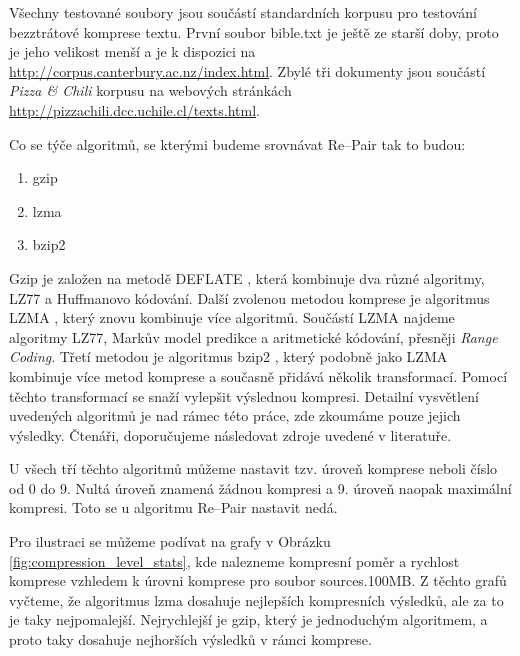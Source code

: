 \documentclass[a4paper,12pt]{article}
\begin{document}
Všechny testované soubory jsou součástí standardních korpusu pro testování bezztrátové komprese textu. První soubor bible.txt je ještě ze starší doby, proto je jeho velikost menší a 
je k dispozici na \url{http://corpus.canterbury.ac.nz/index.html}. Zbylé tři dokumenty jsou součástí \emph{Pizza \& Chili} korpusu na webových stránkách \linebreak \url{http://pizzachili.dcc.uchile.cl/texts.html}.

Co se týče algoritmů, se kterými budeme srovnávat Re--Pair tak to budou:
\begin{enumerate}
    \item gzip
    \item lzma
    \item bzip2
\end{enumerate}

Gzip je založen na metodě DEFLATE \cite{deflate_spec}, která kombinuje dva různé algoritmy, LZ77 \cite{LZ77} a Huffmanovo kódování. Další zvolenou metodou komprese je algoritmus LZMA \cite{lzma}, který znovu kombinuje více algoritmů. Součástí LZMA najdeme algoritmy LZ77, Markův model predikce a aritmetické kódování, přesněji \emph{Range Coding}. Třetí metodou je algoritmus bzip2 \cite{bzip2}, který podobně jako LZMA kombinuje více metod komprese a současně přidává několik transformací. Pomocí těchto transformací se snaží vylepšit výslednou kompresi. Detailní vysvětlení uvedených algoritmů je nad rámec této práce, zde zkoumáme pouze jejich výsledky. Čtenáři, doporučujeme následovat zdroje uvedené v literatuře.

U všech tří těchto algoritmů můžeme nastavit tzv. úroveň komprese neboli číslo od 0 do 9. Nultá úroveň znamená žádnou kompresi a 9. úroveň naopak maximální kompresi. Toto se u algoritmu Re--Pair nastavit nedá. 

Pro ilustraci se můžeme podívat na grafy v Obrázku \ref{fig:compression_level_stats}, kde nalezneme kompresní poměr a rychlost komprese vzhledem k úrovni komprese pro soubor sources.100MB. \linebreak Z těchto grafů vyčteme, že algoritmus lzma dosahuje nejlepších kompresních výsledků, ale za to je taky nejpomalejší. Nejrychlejší je gzip, který je jednoduchým algoritmem, \linebreak a proto taky dosahuje nejhorších výsledků v rámci komprese.
\end{document}
